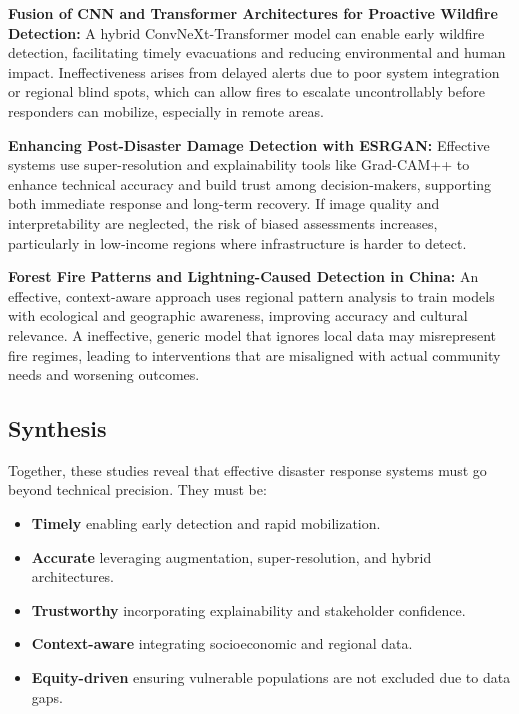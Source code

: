 \documentclass[conference,a4paper]{IEEEtran}
\begin{document}
\textbf{Fusion of CNN and Transformer Architectures for Proactive Wildfire Detection:}
A hybrid ConvNeXt-Transformer model can enable early wildfire detection, facilitating timely evacuations and reducing environmental and human impact. Ineffectiveness arises from delayed alerts due to poor system integration or regional blind spots, which can allow fires to escalate uncontrollably before responders can mobilize, especially in remote areas.

\textbf{Enhancing Post-Disaster Damage Detection with ESRGAN:}
Effective systems use super-resolution and explainability tools like Grad-CAM++ to enhance technical accuracy and build trust among decision-makers, supporting both immediate response and long-term recovery. If image quality and interpretability are neglected, the risk of biased assessments increases, particularly in low-income regions where infrastructure is harder to detect.

\textbf{Forest Fire Patterns and Lightning-Caused Detection in China:}
An effective, context-aware approach uses regional pattern analysis to train models with ecological and geographic awareness, improving accuracy and cultural relevance. A ineffective, generic model that ignores local data may misrepresent fire regimes, leading to interventions that are misaligned with actual community needs and worsening outcomes.

\subsection{Synthesis}

Together, these studies reveal that effective disaster response systems must go beyond technical precision. They must be:

\begin{itemize}
    \item \textbf{Timely} enabling early detection and rapid mobilization.
    \item \textbf{Accurate} leveraging augmentation, super-resolution, and hybrid architectures.
    \item \textbf{Trustworthy} incorporating explainability and stakeholder confidence.
    \item \textbf{Context-aware} integrating socioeconomic and regional data.
    \item \textbf{Equity-driven} ensuring vulnerable populations are not excluded due to data gaps.
\end{itemize}
\end{document}
